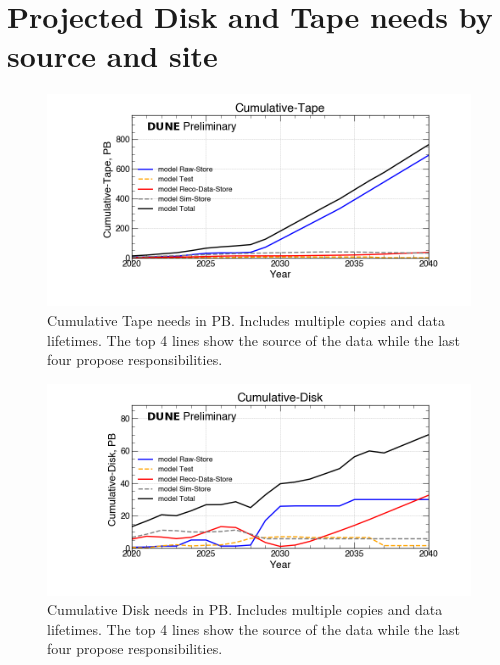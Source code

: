 \section{Projected Disk and Tape needs by source and site}
\begin{figure}[h]
\centering\includegraphics[height=0.4\textwidth]{DOE23-NDLAr_2023-11-03-2040_noMWC/DOE23-NDLAr_2023-11-03-2040_noMWC-Cumulative-Tape.png}
\caption{Cumulative Tape needs in PB. Includes multiple copies and data lifetimes. The top 4 lines show the source of the data while the last four propose responsibilities.}
\label{fig:Cumulative-Tape}
\end{figure}
\begin{figure}[h]
\centering\includegraphics[height=0.4\textwidth]{DOE23-NDLAr_2023-11-03-2040_noMWC/DOE23-NDLAr_2023-11-03-2040_noMWC-Cumulative-Disk.png}
\caption{Cumulative Disk needs in PB. Includes multiple copies and data lifetimes. The top 4 lines show the source of the data while the last four propose responsibilities.}
\label{fig:Cumulative-Disk}
\end{figure}
